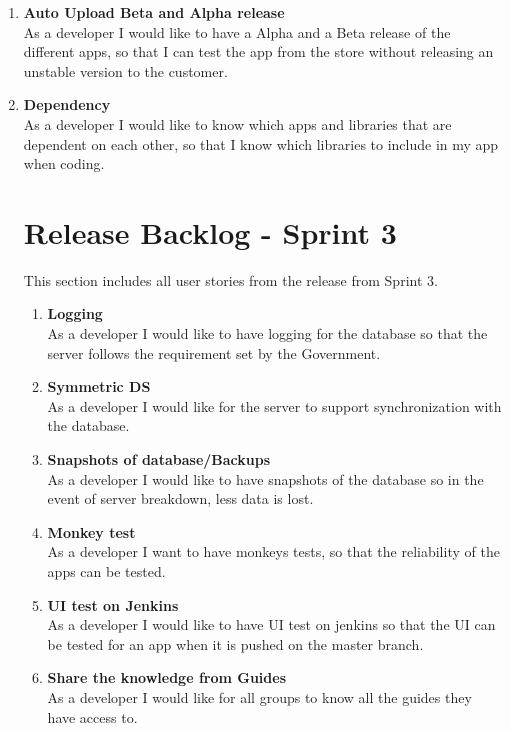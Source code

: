 \begin{enumerate}
\item \textbf{Auto Upload Beta and Alpha release}\\
As a developer I would like to have a Alpha and a Beta release of the different apps, so that I can test the app from the store without releasing an unstable version to the customer.

\item \textbf{Dependency}\\
As a developer I would like to know which apps and libraries that are dependent on each other, so that I know which libraries to include in my app when coding.

\section{Release Backlog - Sprint 3}
This section includes all user stories from the release from Sprint 3.

\begin{enumerate}

\item \textbf{Logging}\\
As a developer I would like to have logging for the database so that the server follows the requirement set by the Government.

\item \textbf{Symmetric DS}\\
As a developer I would like for the server to support synchronization with the database.

\item \textbf{Snapshots of database/Backups}\\
As a developer I would like to have snapshots of the database so in the event of server breakdown, less data is lost.

\item \textbf{Monkey test}\\
As a developer I want to have monkeys tests, so that the reliability of the apps can be tested.

\item \textbf{UI test on Jenkins}\\
As a developer I would like to have UI test on jenkins so that the UI can be tested for an app when it is pushed on the master branch.

\item \textbf{Share the knowledge from Guides}\\
As a developer I would like for all groups to know all the guides they have access to.


\end{enumerate}
\end{enumerate}
